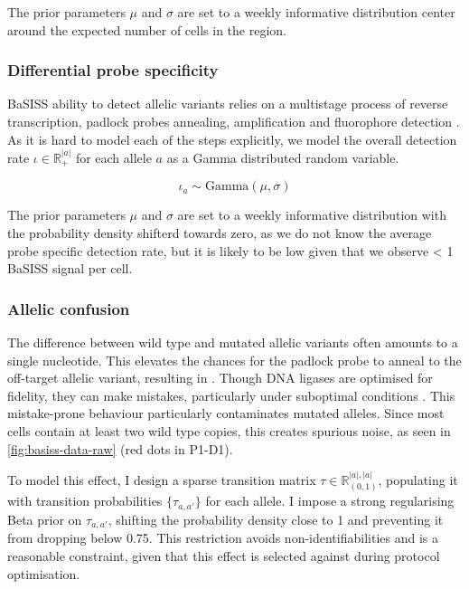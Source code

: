 The prior parameters $\mu$ and $\sigma$ are set to a weekly informative distribution center around the expected number of cells in the region.

\subsubsection*{Differential probe specificity}

\ac{BaSISS} ability to detect allelic variants relies on a multistage process of reverse transcription, padlock probes annealing, amplification and fluorophore detection \parencite{Svedlund2019-xb}. As it is hard to model each of the steps explicitly, we model the overall detection rate $\iota \in \mathbb{R}^{|a|}_{+}$ for each allele $a$ as a Gamma distributed random variable.

\begin{equation}
    {\iota}_{a} \sim \text{Gamma}(\mu, \sigma)
\end{equation}

The prior parameters $\mu$ and $\sigma$ are set to a weekly informative distribution with the probability density shifterd towards zero, as we do not know the average probe specific detection rate, but it is likely to be low given that we observe < 1 \ac{BaSISS} signal per cell.

\subsubsection*{Allelic confusion}
\label{sec:allelic-confusion}

The difference between wild type and mutated allelic variants often amounts to a single nucleotide. This elevates the chances for the padlock probe to anneal to the off-target allelic variant, resulting in . Though DNA ligases are optimised for fidelity, they can make mistakes, particularly under suboptimal conditions \parencite{Lohman2016-ec}. This mistake-prone behaviour particularly contaminates mutated alleles. Since most cells contain at least two wild type copies, this creates spurious noise, as seen in \cref{fig:basiss-data-raw} (red dots in P1-D1).

To model this effect, I design a sparse transition matrix ${\tau} \in \mathbb{R}^{|a|, |a|}_{(0,1)} $, populating it with transition probabilities $ \{ {\tau}_{a,a'}\} $ for each allele. I impose a strong regularising Beta prior on $ \tau_{a,a'} $, shifting the probability density close to 1 and preventing it from dropping below 0.75. This restriction avoids non-identifiabilities and is a reasonable constraint, given that this effect is selected against during protocol optimisation.

